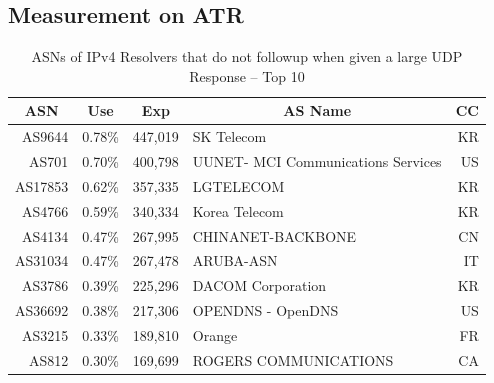 \subsection{Measurement on ATR}

\begin{table}[t]
   \caption{ASNs of IPv4 Resolvers that do not followup when given a large UDP Response – Top 10}
   \centering
\begin{tabular}{@{}rrrlr@{}}
\toprule
\multicolumn{1}{c}{\textbf{ASN}} & \multicolumn{1}{c}{\textbf{Use}} & \multicolumn{1}{c}{\textbf{Exp}} & \multicolumn{1}{c}{\textbf{AS Name}} & \multicolumn{1}{l}{\textbf{CC}} \\ \midrule
AS9644 & 0.78\% & 447,019 & SK Telecom & KR \\
AS701 & 0.70\% & 400,798 & UUNET- MCI Communications Services & US \\
AS17853 & 0.62\% & 357,335 & LGTELECOM & KR \\
AS4766 & 0.59\% & 340,334 & Korea Telecom & KR \\
AS4134 & 0.47\% & 267,995 & CHINANET-BACKBONE & CN \\
AS31034 & 0.47\% & 267,478 & ARUBA-ASN & IT \\
AS3786 & 0.39\% & 225,296 & DACOM Corporation & KR \\
AS36692 & 0.38\% & 217,306 & OPENDNS - OpenDNS & US \\
AS3215 & 0.33\% & 189,810 & Orange & FR \\
AS812 & 0.30\% & 169,699 & ROGERS COMMUNICATIONS & CA \\ \bottomrule
\end{tabular}
\label{tab:ASN-IPv4}
\end{table}


